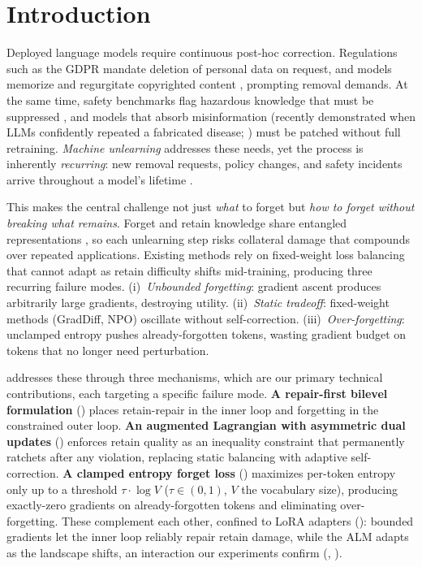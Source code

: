 \section{Introduction}
\label{sec:introduction}

Deployed language models require continuous post-hoc correction.
Regulations such as the GDPR \citep{voigt2017gdpr} mandate deletion of personal data on request, and models memorize and regurgitate copyrighted content \citep{carlini2021extracting}, prompting removal demands.
At the same time, safety benchmarks flag hazardous knowledge that must be suppressed \citep{li2024wmdp}, and models that absorb misinformation (recently demonstrated when LLMs confidently repeated a fabricated disease; \citealt{bixonimania}) must be patched without full retraining.
\emph{Machine unlearning} addresses these needs, yet the process is inherently \emph{recurring}: new removal requests, policy changes, and safety incidents arrive throughout a model's lifetime \citep{liu2025rethinking}.

This makes the central challenge not just \emph{what} to forget but \emph{how to forget without breaking what remains}.
Forget and retain knowledge share entangled representations \citep{cheng2026unlearning}, so each unlearning step risks collateral damage that compounds over repeated applications.
Existing methods rely on fixed-weight loss balancing \citep{liu2025rethinking, zhang2024negative} that cannot adapt as retain difficulty shifts mid-training, producing three recurring failure modes.
(i)~\emph{Unbounded forgetting}: gradient ascent \citep{jang2023knowledge} produces arbitrarily large gradients, destroying utility.
(ii)~\emph{Static tradeoff}: fixed-weight methods (GradDiff, NPO) oscillate without self-correction.
(iii)~\emph{Over-forgetting}: unclamped entropy \citep{yuan2025closer} pushes already-forgotten tokens, wasting gradient budget on tokens that no longer need perturbation.

\method addresses these through three mechanisms, which are our primary technical contributions, each targeting a specific failure mode.
\textbf{A repair-first bilevel formulation} () places retain-repair in the inner loop and forgetting in the constrained outer loop.
\textbf{An augmented Lagrangian with asymmetric dual updates} () enforces retain quality as an inequality constraint that permanently ratchets after any violation, replacing static balancing with adaptive self-correction.
\textbf{A clamped entropy forget loss} () maximizes per-token entropy only up to a threshold $\tau \cdot \log V$ ($\tau\!\in\!(0,1)$, $V$ the vocabulary size), producing exactly-zero gradients on already-forgotten tokens and eliminating over-forgetting.
These complement each other, confined to LoRA adapters (): bounded gradients let the inner loop reliably repair retain damage, while the ALM adapts as the landscape shifts, an interaction our experiments confirm (, ).

